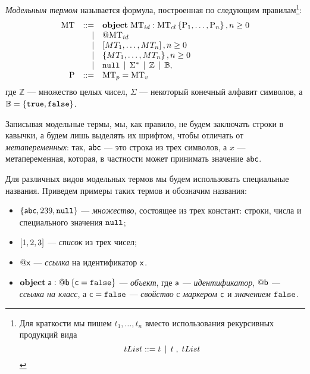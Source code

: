 \begin{Def}\label{defmt}
\emph{Модельным термом} называется формула, построенная по следующим правилам\footnote{
Для краткости мы пишем $t_1, \ldots, t_n$ вместо использования рекурсивных продукций вида $$tList ::= t \;\,|\;\, t \;,\; tList$$
}:
\[
\begin{array}{rrl}
	\mbox{MT} & ::= & \mathbf{object}\;\mbox{MT}_{id} : \mbox{MT}_{cl}\left\{ \mbox{P}_1,\ldots,\mbox{P}_n \right\}, n \ge 0 \\ 
	           &   | & @\mbox{MT}_{id} \\ 
	           &   | & \left[MT_1,\ldots,MT_n\right], n \ge 0 \\ 
	           &   | & \left\{MT_1,\ldots,MT_n\right\}, n \ge 0 \\ 
	           &   | & \mathtt{null} \;\,|\;\, \Sigma^* \;\,|\;\, \mathbb{Z} \;\,|\;\, \mathbb{B}, \\
	\mbox{P} & ::= & \mbox{MT}_{p}=\mbox{MT}_{v}\\
\end{array}
\]
где $\mathbb{Z}$ --- множество целых чисел, $\Sigma$ --- некоторый конечный алфавит символов, а $\mathbb{B} = \left\{ \mathtt{true}, \mathtt{false} \right\}$.
\end{Def}

Записывая модельные термы, мы, как правило, не будем заключать строки в кавычки, а будем лишь выделять их шрифтом, чтобы отличать от \emph{метапеременных}: так, $\mathsf{abc}$ --- это строка из трех символов, а $x$ --- метапеременная, которая, в частности может принимать значение $\mathsf{abc}$.

Для различных видов модельных термов мы будем использовать специальные названия. Приведем примеры таких термов и обозначим названия:
\begin{itemize}
\item $\left\{\mathsf{abc}, 239, \mathtt{null}\right\}$ --- \emph{множество}, состоящее из трех констант: строки, числа и специального значения $\mathtt{null}$;
\item $\left[1, 2, 3\right]$ --- \emph{список} из трех чисел;
\item $@\mathsf{x}$ --- \emph{ссылка} на идентификатор $\mathsf{x}$.
\item $\mathbf{object}\;\mathsf{a} : @\mathsf{b}\left\{ \mathsf{c}=\mathtt{false} \right\}$ --- \emph{объект}, где $\mathsf{a}$ --- \emph{идентификатор}, $@\mathsf{b}$ --- \emph{ссылка на класс}, а $\mathsf{c} = \mathtt{false}$ --- \emph{свойство} с \emph{маркером} $\mathsf{c}$ и  \emph{значением} $\mathtt{false}$.
\end{itemize}

